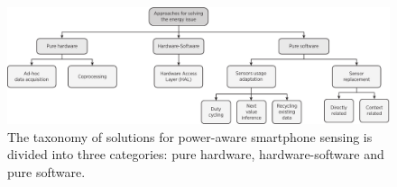 \documentclass[12pt]{article}
\numberwithin{equation}{section}
\numberwithin{table}{section}
\numberwithin{figure}{section}
\begin{document}
\begin{figure}[t]
  \centering
  \includegraphics[width=\textwidth]{approaches-taxonomy}
  \caption{The taxonomy of solutions for power-aware smartphone sensing is divided into three categories: pure hardware, hardware-software and pure software.}
  \label{fig:taxonomy-approaches}
\end{figure}
\end{document}
